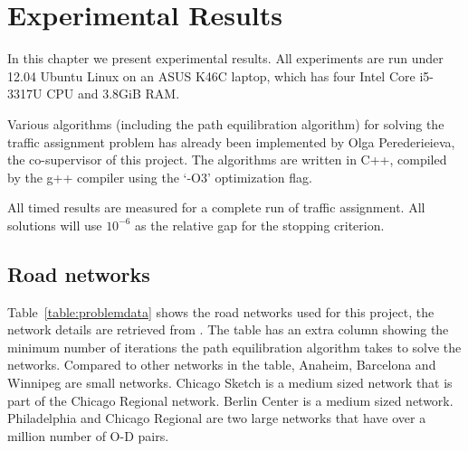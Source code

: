 \chapter{Experimental Results}\label{chap:results}

In this chapter we present experimental results.
All experiments are run under 12.04 Ubuntu Linux on an ASUS K46C laptop,
which has four Intel Core i5-3317U CPU and 3.8GiB RAM.

Various algorithms (including the path equilibration algorithm) for solving
the traffic assignment problem has already been implemented by Olga Perederieieva, the co-supervisor of this project.
The algorithms are written in C++, compiled by the g++ compiler using the `-O3' optimization flag.


All timed results are measured for a complete run of traffic assignment.
All solutions will use $10^{-6}$ as the relative gap for the stopping criterion.

\section{Road networks}

Table~\ref{table:problemdata} shows the road networks used for this project, the network details are retrieved from \citet{ProblemData}.
The table has an extra column showing the minimum number of iterations the path equilibration algorithm takes to solve the networks.
Compared to other networks in the table,
Anaheim, Barcelona and Winnipeg are small networks.
Chicago Sketch is a medium sized network that is part of the Chicago Regional network.
Berlin Center is a medium sized network.
Philadelphia and Chicago Regional are two large networks that have over a million number of O-D pairs.


